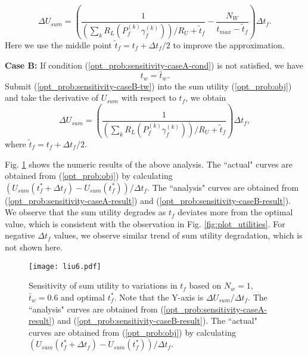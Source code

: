 \documentclass[journal,final,letterpaper,10pt,doublecolumn,twoside]{IEEEtran}
\begin{document}
\begin{equation}
\Delta U_{sum} = \left (\frac{1}{(\sum_k R_L(P_f^{(k)} \gamma_f^{(k)}))/R_U + \tilde{t}_f} - \frac{N_W}{ t_{max} - \tilde{t}_f} \right ) \Delta t_f.
 \label{opt_prob:sensitivity-caseA-result}
\end{equation}
Here we use the middle point $\tilde{t}_f = t_f + \Delta t_f/2$ to improve the approximation.


\textbf{Case B:} If condition (\ref{opt_prob:sensitivity-caseA-cond}) is not satisfied, we have
\begin{equation}
t_w = \bar{t}_w.
 \label{opt_prob:sensitivity-caseB-tw}
\end{equation}
Submit (\ref{opt_prob:sensitivity-caseB-tw}) into the sum utility (\ref{opt_prob:obj})  and take the derivative of $U_{sum}$ with respect to $t_f$, we obtain
\begin{equation}
\Delta U_{sum} = \left (\frac{1}{(\sum_k R_L(P_f^{(k)} \gamma_f^{(k)}))/R_U + \tilde{t}_f} \right ) \Delta t_f,
 \label{opt_prob:sensitivity-caseB-result}
\end{equation}
where  $\tilde{t}_f= t_f + \Delta t_f/2$.



Fig. \ref{fig:sensitivity} shows the numeric results of the above analysis. The ``actual" curves are obtained from (\ref{opt_prob:obj}) by calculating $(U_{sum}(t^*_f+\Delta t_f)-U_{sum}(t^*_f))/\Delta t_f$. The ``analysis" curves are obtained from (\ref{opt_prob:sensitivity-caseA-result}) and (\ref{opt_prob:sensitivity-caseB-result}). We observe that the sum utility degrades as $t_f$ deviates more from the optimal value, which is consistent with the observation in Fig. \ref{fig:plot_utilities}.
For negative $\Delta t_f$ values, we observe similar trend of sum utility degradation, which is not shown here.

\begin{figure}
  \center
  \texttt{[image: liu6.pdf]}
  \caption{ Sensitivity of sum utility to variations in $t_f$ based on $N_w=1$, $\bar{t}_w = 0.6$ and optimal $t^*_f$. Note that the Y-axis is $\Delta U_{sum}/\Delta t_f$.  The ``analysis" curves are obtained from (\ref{opt_prob:sensitivity-caseA-result}) and (\ref{opt_prob:sensitivity-caseB-result}).   The ``actual" curves are obtained from (\ref{opt_prob:obj}) by calculating $(U_{sum}(t^*_f+\Delta t_f)-U_{sum}(t^*_f))/\Delta t_f$.  } \label{fig:sensitivity}
\end{figure}
\end{document}
